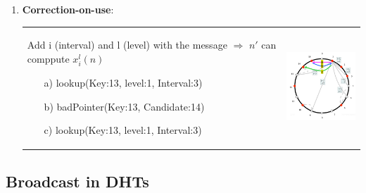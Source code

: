 \begin{enumerate}
    \item \textbf{Correction-on-use}:

        \begin{tabular}{m{10cm}m{4cm}}
            Add i (interval) and l (level) with the message
            $\Rightarrow$ $n'$ can comppute $x_i^l(n)$

            \begin{itemize}
                \item[a)] lookup(Key:13, level:1, Interval:3)
                \item[b)] badPointer(Key:13, Candidate:14)
                \item[c)] lookup(Key:13, level:1, Interval:3)
            \end{itemize}

            & \includegraphics[width=4cm]{img/design3.png}
        \end{tabular}
\end{enumerate}


\subsection{Broadcast in DHTs}

